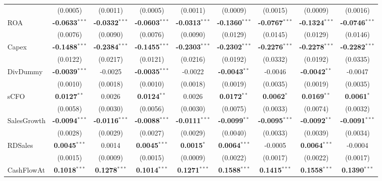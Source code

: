\begin{landscape}
\begin{table}[H]
\begin{tabular}{lcccccccc}
 & (0.0005) & (0.0011) & (0.0005) & (0.0011) & (0.0009) & (0.0015) & (0.0009) & (0.0016) \\
ROA & \textbf{-0.0633}$^{***}$ & \textbf{-0.0332}$^{***}$ & \textbf{-0.0603}$^{***}$ & \textbf{-0.0313}$^{***}$ & \textbf{-0.1360}$^{***}$ & \textbf{-0.0767}$^{***}$ & \textbf{-0.1324}$^{***}$ & \textbf{-0.0746}$^{***}$ \\
 & (0.0076) & (0.0090) & (0.0076) & (0.0090) & (0.0129) & (0.0145) & (0.0129) & (0.0146) \\
Capex & \textbf{-0.1488}$^{***}$ & \textbf{-0.2384}$^{***}$ & \textbf{-0.1455}$^{***}$ & \textbf{-0.2303}$^{***}$ & \textbf{-0.2302}$^{***}$ & \textbf{-0.2276}$^{***}$ & \textbf{-0.2278}$^{***}$ & \textbf{-0.2282}$^{***}$ \\
 & (0.0122) & (0.0217) & (0.0121) & (0.0216) & (0.0192) & (0.0332) & (0.0192) & (0.0335) \\
DivDummy & \textbf{-0.0039}$^{***}$ & -0.0025 & \textbf{-0.0035}$^{***}$ & -0.0022 & \textbf{-0.0043}$^{**}$ & -0.0046 & \textbf{-0.0042}$^{**}$ & -0.0047 \\
 & (0.0010) & (0.0018) & (0.0010) & (0.0018) & (0.0019) & (0.0035) & (0.0019) & (0.0035) \\
sCFO & \textbf{0.0127}$^{**}$ & 0.0026 & \textbf{0.0124}$^{**}$ & 0.0026 & \textbf{0.0172}$^{**}$ & \textbf{0.0062}$^{*}$ & \textbf{0.0169}$^{**}$ & \textbf{0.0061}$^{*}$ \\
 & (0.0058) & (0.0030) & (0.0056) & (0.0030) & (0.0075) & (0.0033) & (0.0074) & (0.0032) \\
SalesGrowth & \textbf{-0.0094}$^{***}$ & \textbf{-0.0116}$^{***}$ & \textbf{-0.0088}$^{***}$ & \textbf{-0.0111}$^{***}$ & \textbf{-0.0099}$^{**}$ & \textbf{-0.0095}$^{***}$ & \textbf{-0.0092}$^{**}$ & \textbf{-0.0091}$^{***}$ \\
 & (0.0028) & (0.0029) & (0.0027) & (0.0029) & (0.0040) & (0.0033) & (0.0039) & (0.0034) \\
RDSales & \textbf{0.0045}$^{***}$ & 0.0014 & \textbf{0.0045}$^{***}$ & \textbf{0.0015}$^{*}$ & \textbf{0.0064}$^{***}$ & -0.0005 & \textbf{0.0064}$^{***}$ & -0.0004 \\
 & (0.0015) & (0.0009) & (0.0015) & (0.0009) & (0.0022) & (0.0017) & (0.0022) & (0.0017) \\
CashFlowAt & \textbf{0.1018}$^{***}$ & \textbf{0.1278}$^{***}$ & \textbf{0.1014}$^{***}$ & \textbf{0.1271}$^{***}$ & \textbf{0.1588}$^{***}$ & \textbf{0.1415}$^{***}$ & \textbf{0.1558}$^{***}$ & \textbf{0.1390}$^{***}$ \\

\end{tabular}
\end{table}
\end{landscape}
